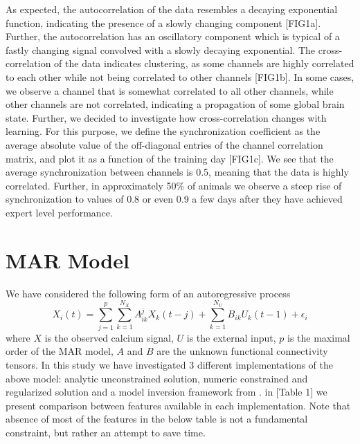 \documentclass[a4paper,10pt]{article}
\begin{document}
As expected, the autocorrelation of the data resembles a decaying exponential function, indicating the presence of a slowly changing component [FIG1a]. Further, the autocorrelation has an oscillatory component which is typical of a fastly changing signal convolved with a slowly decaying exponential. The cross-correlation of the data indicates clustering, as some channels are highly correlated to each other while not being correlated  to other channels [FIG1b]. In some cases, we observe a channel that is somewhat correlated to all other channels, while other channels are not correlated, indicating a propagation of some global brain state. Further, we decided to investigate how cross-correlation changes with learning. For this purpose, we define the synchronization coefficient as the average absolute value of the off-diagonal entries of the channel correlation matrix, and plot it as a function of the training day [FIG1c]. We see that the average synchronization between channels is 0.5, meaning that the data is highly correlated. Further, in approximately 50\% of animals we observe a steep rise of synchronization to values of 0.8 or even 0.9 a few days after they have achieved expert level performance.

\section{MAR Model}

We have considered the following form of an autoregressive process
\begin{equation}
  X_i(t) = \sum_{j=1}^p \sum_{k=1}^{N_X}   A^j_{ik} X_k(t-j) + \sum_{k=1}^{N_U} B_{ik} U_k(t-1) + \epsilon_i 
\end{equation}
where $X$ is the observed calcium signal, $U$ is the external input, $p$ is the maximal order of the MAR model, $A$ and $B$ are the unknown functional connectivity tensors. In this study we have investigated 3 different implementations of the above model: analytic unconstrained solution, numeric constrained and regularized solution and a model inversion framework from \cite{penny_bayesian_2002}. in [Table 1] we present comparison between features available in each implementation. Note that absence of most of the features in the below table is not a fundamental constraint, but rather an attempt to save time.
\end{document}
